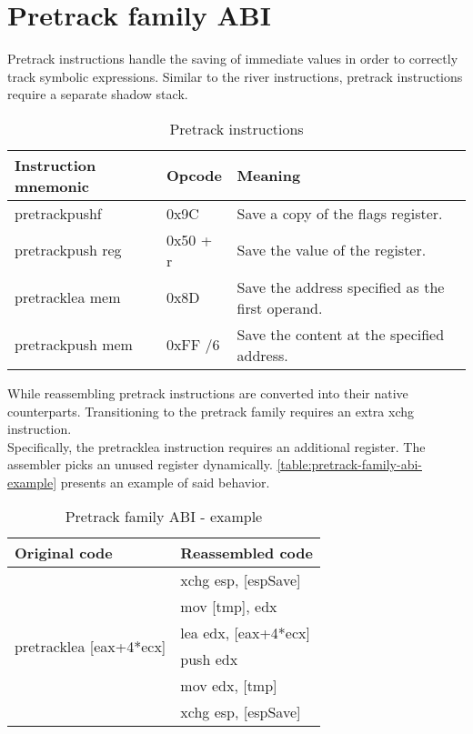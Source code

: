 \documentclass[12pt]{report}
\begin{document}
\section{Pretrack family ABI}
\label{sec:pretrack-family-abi}
Pretrack instructions handle the saving of immediate values in order to correctly track symbolic expressions. Similar to the river instructions, pretrack instructions require a separate shadow stack.\\
\begin{table}[H]
	\begin{tabular}{| l | l | l |}
		\hline
		\textbf{Instruction mnemonic} & \textbf{Opcode} & \textbf{Meaning}\\ \hline
		pretrackpushf & 0x9C & Save a copy of the flags register.\\ \hline
		pretrackpush reg & 0x50 + r & Save the value of the register.\\ \hline
		pretracklea mem & 0x8D & Save the address specified as the first operand.\\ \hline
		pretrackpush mem & 0xFF /6 & Save the content at the specified address.\\ \hline
	\end{tabular}
	\caption{Pretrack instructions}
\end{table}
While reassembling pretrack instructions are converted into their native counterparts. Transitioning to the pretrack family requires an extra xchg instruction.\\
\newline
Specifically, the pretracklea instruction requires an additional register. The assembler picks an unused register dynamically. \autoref{table:pretrack-family-abi-example} presents an example of said behavior.\\
\begin{table}[H]
	\centering
	\begin{tabular}{| l | l |}
		\hline
		\textbf{Original code} & \textbf{Reassembled code}\\ \hline
		\multirow{6}{*}{pretracklea [eax+4*ecx]} & xchg esp, [espSave]\\
		& mov [tmp], edx\\
		& lea edx, [eax+4*ecx]\\
		& push edx\\
		& mov edx, [tmp]\\
		& xchg esp, [espSave]\\ \hline
	\end{tabular}
	\caption{Pretrack family ABI - example}
	\label{table:pretrack-family-abi-example}
\end{table}
\end{document}
